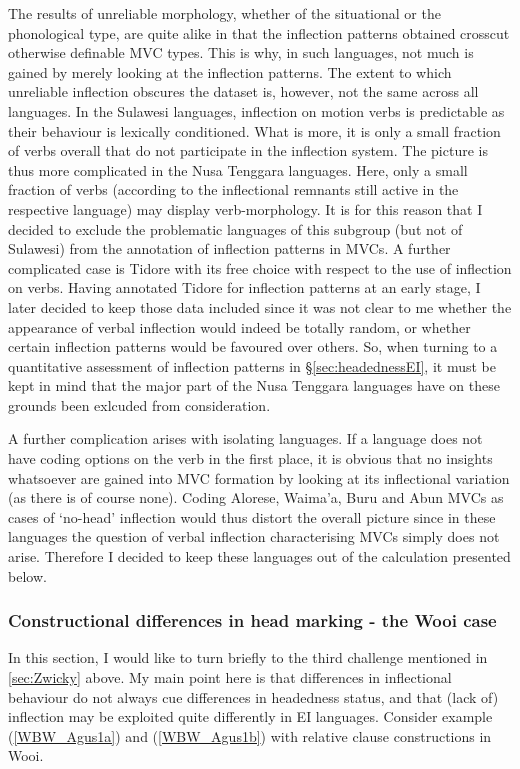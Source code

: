 The results of unreliable morphology, whether of the situational or the phonological type, are quite alike in that the inflection patterns obtained crosscut otherwise definable MVC types. This is why, in such languages, not much is gained by merely looking at the inflection patterns. The extent to which unreliable inflection obscures the dataset is, however, not the same across all languages. In the Sulawesi languages, inflection on motion verbs is predictable as their behaviour is lexically conditioned. What is more, it is only a small fraction of verbs overall that do not participate in the inflection system. The picture is thus more complicated in the Nusa Tenggara languages. Here, only a small fraction of verbs (according to the inflectional remnants still active in the respective language) may display verb-morphology. It is for this reason that I decided to exclude the problematic languages of this subgroup (but not of Sulawesi) from the annotation of inflection patterns in MVCs. A further complicated case is Tidore with its free choice with respect to the use of inflection on verbs. Having annotated Tidore for inflection patterns at an early stage, I later decided to keep those data included since it was not clear to me whether the appearance of verbal inflection would indeed be totally random, or whether certain inflection patterns would be favoured over others. So, when turning to a quantitative assessment of inflection patterns in §\ref{sec:headednessEI}, it must be kept in mind that the major part of the Nusa Tenggara languages have on these grounds been exlcuded from consideration.

A further complication arises with isolating languages. If a language does not have coding options on the verb in the first place, it is obvious that no insights whatsoever are gained into MVC formation by looking at its inflectional variation (as there is of course none). Coding Alorese, Waima'a, Buru and Abun MVCs as cases of `no-head' inflection would thus distort the overall picture since in these languages the question of verbal inflection characterising MVCs simply does not arise. Therefore I decided to keep these languages out of the calculation presented below.

\subsubsection{Constructional differences in head marking - the Wooi case}\label{sec:wooicase}

In this section, I would like to turn briefly to the third challenge mentioned in \ref{sec:Zwicky} above. My main point here is that differences in inflectional behaviour do not always cue differences in headedness status, and that (lack of) inflection may be exploited quite differently in EI languages. Consider example (\ref{WBW_Agus1a}) and (\ref{WBW_Agus1b}) with relative clause constructions in Wooi.

